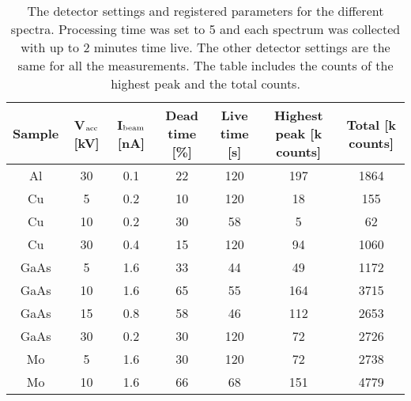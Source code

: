 \begin{table}[p]
    \centering
    \caption{
        The detector settings and registered parameters for the different spectra.
        Processing time was set to 5 and each spectrum was collected with up to 2 minutes time live.
        The other detector settings are the same for all the measurements.
        The table includes the counts of the highest peak and the total counts.
    }
    \label{tab:results:detector:settings}
    \begin{tabular}{ccccccc}
        Sample & V$_\textnormal{acc}$ [kV] & I$_\textnormal{beam}$ [nA] & Dead time [\%] & Live time [s] & Highest peak [k counts] & Total [k counts] \\
        \hline
        Al     & 30                        & 0.1                        & 22             & 120           & 197                     & 1864             \\
        Cu     & 5                         & 0.2                        & 10             & 120           & 18                      & 155              \\
        Cu     & 10                        & 0.2                        & 30             & 58            & 5                       & 62               \\
        Cu     & 30                        & 0.4                        & 15             & 120           & 94                      & 1060             \\
        GaAs   & 5                         & 1.6                        & 33             & 44            & 49                      & 1172             \\
        GaAs   & 10                        & 1.6                        & 65             & 55            & 164                     & 3715             \\
        GaAs   & 15                        & 0.8                        & 58             & 46            & 112                     & 2653             \\
        GaAs   & 30                        & 0.2                        & 30             & 120           & 72                      & 2726             \\
        Mo     & 5                         & 1.6                        & 30             & 120           & 72                      & 2738             \\
        Mo     & 10                        & 1.6                        & 66             & 68            & 151                     & 4779             \\

\end{tabular}
\end{table}
